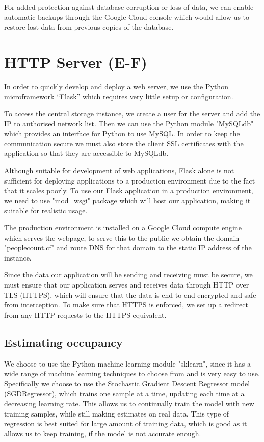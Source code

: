 \documentclass{l4proj}
\begin{document}
For added protection against database corruption or loss of data, we can enable automatic backups through the Google Cloud console which would allow us to restore lost data from previous copies of the database.
 

\section{HTTP Server (E-F)}
In order to quickly develop and deploy a web server, we use the Python microframework “Flask” which requires very little setup or configuration. 

To access the central storage instance, we create a user for the server and add the IP to authorised network list. Then we can use the Python module "MySQLdb" which provides an interface for Python to use MySQL. In order to keep the communication secure we must also store the client SSL certificates with the application so that they are accessible to MySQLdb.

Although suitable for development of web applications, Flask alone is not sufficient for deploying applications to a production environment due to the fact that it scales poorly. To use our Flask application in a production environment, we need to use "mod\_wsgi" package which will host our application, making it suitable for realistic usage.

The production environment is installed on a Google Cloud compute engine which serves the webpage, to serve this to the public we obtain the domain "peoplecount.cf" and route DNS for that domain to the static IP address of the instance.

Since the data our application will be sending and receiving must be secure, we must ensure that our application serves and receives data through HTTP over TLS (HTTPS), which will ensure that the data is end-to-end encrypted and safe from interception.
To make sure that HTTPS is enforced, we set up a redirect from any HTTP requests to the HTTPS equivalent.

\subsection{Estimating occupancy}

We choose to use the Python machine learning module "sklearn", since it has a wide range of machine learning techniques to choose from and is very easy to use. Specifically we choose to use the Stochastic Gradient Descent Regressor model (SGDRegressor), which trains one sample at a time, updating each time at a decreasing learning rate. This allows us to continually train the model with new training samples, while still making estimates on real data. This type of regression is best suited for large amount of training data, which is good as it allows us to keep training, if the model is not accurate enough.
\end{document}
